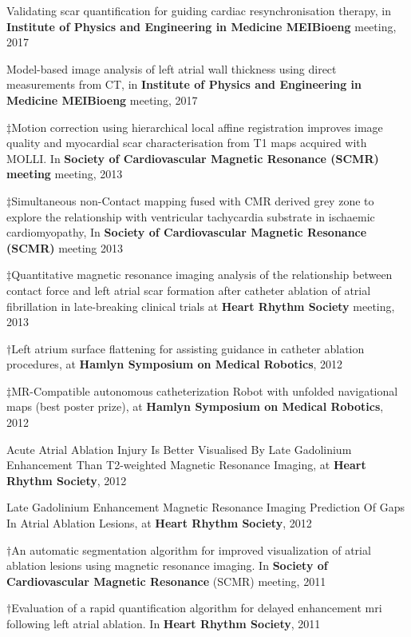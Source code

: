 \documentclass[letterpaper]{twentysecondcv} %
\begin{document}
\renewcommand{\theenumi}{A\arabic{enumi}}
\begin{etaremune}
\item *Validating scar quantification for guiding cardiac resynchronisation therapy, in \textbf{Institute of Physics and Engineering in Medicine MEIBioeng} meeting, 2017
\item *Model-based image analysis of left atrial wall thickness using direct measurements from CT, in \textbf{Institute of Physics and Engineering in Medicine MEIBioeng} meeting, 2017  
\item $\ddagger$Motion correction using hierarchical local affine registration improves image quality and myocardial scar characterisation from T1 maps acquired with MOLLI. In \textbf{Society of Cardiovascular Magnetic Resonance (SCMR) meeting} meeting, 2013
\item $\ddagger$Simultaneous non-Contact mapping fused with CMR derived grey zone to explore the relationship with ventricular tachycardia substrate in ischaemic cardiomyopathy, In \textbf{Society of Cardiovascular Magnetic Resonance (SCMR)} meeting 2013 
\item $\ddagger$Quantitative magnetic resonance imaging analysis of the relationship between contact force and left atrial scar formation after catheter ablation of atrial fibrillation in late-breaking clinical trials at \textbf{Heart Rhythm Society} meeting, 2013 
\item $\dagger$Left atrium surface flattening for assisting guidance in catheter ablation procedures, at \textbf{Hamlyn Symposium on Medical Robotics}, 2012
\item $\ddagger$MR-Compatible autonomous catheterization Robot with unfolded navigational maps (best poster prize), at \textbf{Hamlyn Symposium on Medical Robotics}, 2012
\item Acute Atrial Ablation Injury Is Better Visualised By Late Gadolinium Enhancement Than T2-weighted Magnetic Resonance Imaging, at \textbf{Heart Rhythm Society}, 2012
\item Late Gadolinium Enhancement Magnetic Resonance Imaging Prediction Of Gaps In Atrial Ablation Lesions, at \textbf{Heart Rhythm Society}, 2012  
\item $\dagger$An automatic segmentation algorithm for improved visualization of atrial ablation lesions using magnetic resonance imaging. In  \textbf{Society of Cardiovascular Magnetic Resonance} (SCMR) meeting, 2011
\item $\dagger$Evaluation of a rapid quantification algorithm for delayed enhancement mri following left atrial ablation. In \textbf{Heart Rhythm Society}, 2011

\end{etaremune}
\end{document}
